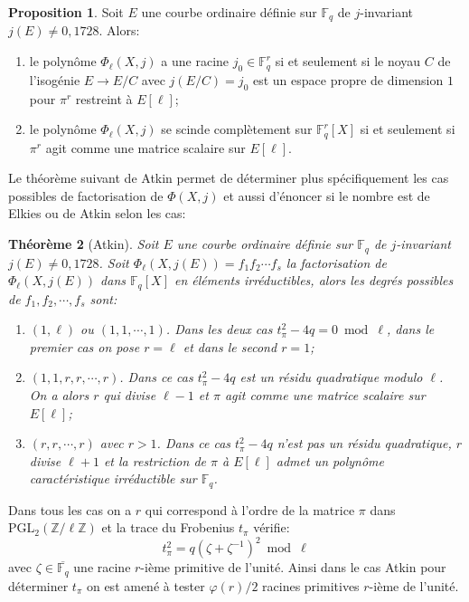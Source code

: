 \documentclass[10pt,a4paper]{book}
\theoremstyle{plain}
\newtheorem{thm}{Théorème}[chapter]
\theoremstyle{definition}
\theoremstyle{definition}
\theoremstyle{definition}
\theoremstyle{definition}
\newtheorem{prop}[thm]{Proposition}
\theoremstyle{definition}
\theoremstyle{remark}
\theoremstyle{remark}
\theoremstyle{definition}
\begin{document}


\begin{prop}\label{pro:def-ss-grp}
Soit $E$ une courbe ordinaire définie sur $\mathbb{F}_q$ de $j$-invariant $j(E) \neq 0, 1728$. Alors:
\begin{enumerate}
\item le polynôme $\Phi_{\ell}(X,j)$ a une racine $j_0 \in \mathbb{F}_{q}^r$ si et seulement si le noyau $C$ de l'isogénie $E \to E/C$ avec $j(E/C)=j_0$ est un espace propre de dimension $1$ pour $\pi^r$ restreint à $E[\ell]$;
\item le polynôme $\Phi_{\ell}(X,j)$ se scinde complètement sur $ \mathbb{F}_{q}^r[X]$ si et seulement si $\pi^r$ agit comme une matrice scalaire sur $E[\ell]$.
\end{enumerate}
\end{prop}

Le théorème suivant de Atkin permet de déterminer plus spécifiquement les cas possibles de factorisation de $\Phi(X,j)$  et aussi d'énoncer si le nombre est de Elkies ou de Atkin selon les cas:

\begin{thm}[Atkin]\label{thm:Atkin}
Soit $E$ une courbe ordinaire définie sur $\mathbb{F}_q$ de $j$-invariant $j(E) \neq 0, 1728$. Soit $\Phi_{\ell}(X,j(E))=f_1f_2\cdots f_s$ la factorisation de $\Phi_{\ell}(X,j(E))$ dans $\mathbb{F}_q[X]$ en éléments irréductibles, alors les degrés possibles de $f_1,f_2, \cdots , f_s$ sont:
\begin{enumerate}
\item $(1,\ell)$ ou $(1,1, \cdots, 1)$. Dans les deux cas $t_{\pi}^2-4q=0 \bmod \ell $, dans le premier cas on pose $r=\ell$ et dans le second $r=1$;
\item $(1,1,r,r, \cdots,r)$. Dans ce cas $t_{\pi}^2-4q$ est un résidu quadratique modulo $\ell$. On a alors $r$ qui divise $\ell-1$ et $\pi$ agit comme une matrice scalaire sur $E[\ell]$;
\item $(r,r,\cdots,r)$ avec $r>1$. Dans ce cas $t_{\pi}^2-4q$ n'est pas un résidu quadratique, $r$ divise $\ell+1$ et la restriction de $\pi$ à $E[\ell]$ admet un polynôme caractéristique irréductible sur $\mathbb{F}_q$. 
\end{enumerate}
\end{thm}
Dans tous les cas on a $r$ qui correspond à l'ordre de la matrice $\pi$ dans $\mathrm{PGL_2}(\mathbb{Z}/\ell \mathbb{Z})$ et la trace du Frobenius $t_{\pi}$ vérifie:
\begin{equation}
\label{eq:sea:tra}
t_{\pi}^2=q(\zeta + \zeta^{-1})^2 \bmod \ell
\end{equation}
avec $\zeta \in \overline{\mathbb{F}_q}$ une racine $r$-ième primitive de l'unité. Ainsi dans le cas Atkin pour déterminer $t_{\pi}$ on est amené à tester $\varphi(r)/2$ racines primitives $r$-ième de l'unité.
\end{document}

